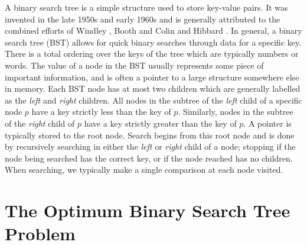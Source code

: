\documentclass[letterpaper,12pt,titlepage,oneside,final]{book}
\theoremstyle{plain}
\begin{document}
A binary search tree is a simple structure used to store key-value pairs. It was invented in the late 1950s and early 1960s and is generally attributed to the combined efforts of Windley \cite{windley1960trees}, Booth and Colin \cite{booth1960efficiency} and Hibbard \cite{hibbard1962some}. In general, a binary search tree (BST) allows for quick binary searches through data for a specific key. There is a total ordering over the keys of the tree which are typically numbers or words. The value of a node in the BST usually represents some piece of important information, and is often a pointer to a large structure somewhere else in memory. Each BST node has at most two children which are generally labelled as the \textit{left} and \textit{right} children. All nodes in the subtree of the \textit{left} child of a specific node $p$ have a key strictly less than the key of $p$. Similarly, nodes in the subtree of the \textit{right} child of $p$ have a key strictly greater than the key of $p$. A pointer is typically stored to the root node. Search begins from this root node and is done by recursively searching in either the \textit{left} or \textit{right} child of a node; stopping if the node being searched has the correct key, or if the node reached has no children. When searching, we typically make a single comparison at each node visited.

\section{The Optimum Binary Search Tree Problem}
\end{document}
